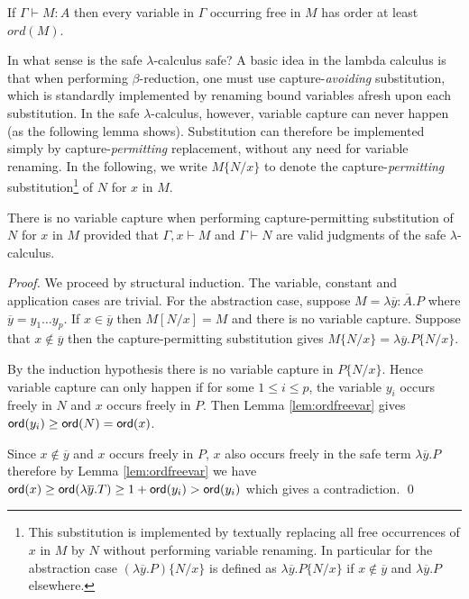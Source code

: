 \documentclass{llncs}
\newcommand\subst[2]{\left[ #1/#2 \right]}
\newcommand\captsubst[2]{\{#1/#2 \}}
\begin{document}
\begin{lemma}
\label{lem:ordfreevar}
If $\Gamma \vdash M : A$ then every variable in $\Gamma$ occurring
free in $M$ has order at least $ord(M)$.
\end{lemma}

In what sense is the safe $\lambda$-calculus safe? A basic idea in the
lambda calculus is that when performing $\beta$-reduction, one must
use capture-\emph{avoiding} substitution, which is standardly
implemented by renaming bound variables afresh upon each substitution.
In the safe $\lambda$-calculus, however, variable capture can never
happen (as the following lemma shows). Substitution can therefore be
implemented simply by capture-\emph{permitting} replacement, without
any need for variable renaming. In the following, we write
$M\captsubst{N}{x}$ to denote the capture-\emph{permitting}
substitution\footnote{This substitution is implemented by textually
  replacing all free occurrences of $x$ in $M$ by $N$ without
  performing variable renaming.  In particular for the abstraction
  case $(\lambda \overline{y} . P)\captsubst{N}{x}$ is defined as
  $\lambda \overline{y} . P\captsubst{N}{x}$ if $x\not\in
  \overline{y}$ and $\lambda \overline{y} . P$ elsewhere.} of $N$ for
$x$ in $M$.

\begin{lemma}
\label{lem:homog_nocapture} There is
no variable capture when performing capture-permitting
substitution of $N$ for $x$ in $M$
provided that $\Gamma, x \vdash M$ and $\Gamma \vdash  N$ are valid judgments of the safe $\lambda$-calculus.
\end{lemma}

\begin{proof}
  We proceed by structural induction. The variable, constant and
  application cases are trivial. For the abstraction case, suppose $M
  = \lambda \overline{y} : \overline{A}. P$ where $\overline{y} = y_1
  \ldots y_p$. If $x \in \overline{y}$ then $M \subst{N}{x} = M$ and
  there is no variable capture.  Suppose that $x \not\in \overline{y}$
  then the capture-permitting substitution gives $M \captsubst{N}{x} =
  \lambda \overline{y} . P \captsubst{N}{x}$.

  By the induction hypothesis there is no variable capture in $P
  \captsubst{N}{x}$.  Hence variable capture can only happen if for
  some $1 \leq i \leq p$, the variable $y_i$ occurs freely in $N$ and
  $x$ occurs freely in $P$. Then Lemma \ref{lem:ordfreevar} gives $
  {\sf ord}(y_i) \geq {\sf ord}(N) = {\sf ord}(x)$.

  Since $x \not \in \overline{y}$ and $x$ occurs freely in $P$, $x$
  also occurs freely in the safe term $\lambda \overline{y}. P$
  therefore by Lemma \ref{lem:ordfreevar} we have $ {\sf ord}(x) \geq
  {\sf ord}(\lambda \overline{y} . T) \geq 1+ {\sf ord}(y_i) > {\sf ord}(y_i)$ which
  gives a contradiction. \qed
\end{proof}
\end{document}
